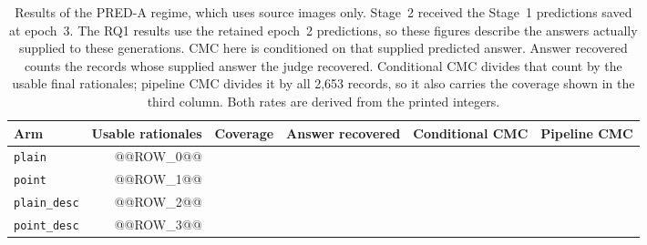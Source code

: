 \begin{table}[ht]
\centering
\caption[Secondary predicted-answer regime]{Results of the PRED-A regime,
which uses source images only. Stage~2 received the Stage~1 predictions
saved at epoch~3. The RQ1 results use the retained epoch~2 predictions, so
these figures describe the answers actually supplied to these generations.
CMC here is conditioned on that supplied predicted answer. Answer recovered
counts the records whose supplied answer the judge recovered. Conditional
CMC divides that count by the usable final rationales; pipeline CMC divides
it by all 2,653 records, so it also carries the coverage shown in the third
column. Both rates are derived from the printed integers.}
\label{tab:pred-a-compact}
\begin{tabular}{lrrrrr}
\toprule
Arm & Usable rationales & Coverage & Answer recovered & Conditional CMC & Pipeline CMC \\
\midrule
\texttt{plain} & @@ROW_0@@ \\
\texttt{point} & @@ROW_1@@ \\
\texttt{plain\_desc} & @@ROW_2@@ \\
\texttt{point\_desc} & @@ROW_3@@ \\
\bottomrule
\end{tabular}
\end{table}
